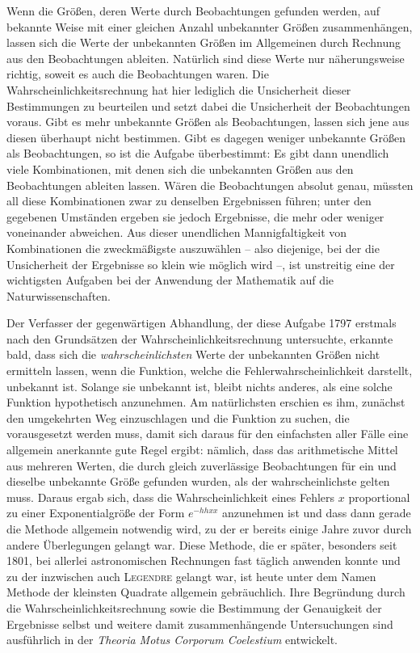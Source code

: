 Wenn die Größen, deren Werte durch Beobachtungen gefunden werden, auf bekannte Weise mit einer gleichen Anzahl unbekannter Größen zusammenhängen, lassen sich die Werte der unbekannten Größen im Allgemeinen durch Rechnung aus den Beobachtungen ableiten. Natürlich sind diese Werte nur näherungsweise richtig, soweit es auch die Beobachtungen waren. Die Wahrscheinlichkeitsrechnung hat hier lediglich die Unsicherheit dieser Bestimmungen zu beurteilen und setzt dabei die Unsicherheit der Beobachtungen voraus. Gibt es mehr unbekannte Größen als Beobachtungen, lassen sich jene aus diesen überhaupt nicht bestimmen. Gibt es dagegen weniger unbekannte Größen als Beobachtungen, so ist die Aufgabe überbestimmt: Es gibt dann unendlich viele Kombinationen, mit denen sich die unbekannten Größen aus den Beobachtungen ableiten lassen. Wären die Beobachtungen absolut genau, müssten all diese Kombinationen zwar zu denselben Ergebnissen führen; unter den gegebenen Umständen ergeben sie jedoch Ergebnisse, die mehr oder weniger voneinander abweichen. Aus dieser unendlichen Mannigfaltigkeit von Kombinationen die zweckmäßigste auszuwählen – also diejenige, bei der die Unsicherheit der Ergebnisse so klein wie möglich wird –, ist unstreitig eine der wichtigsten Aufgaben bei der Anwendung der Mathematik auf die Naturwissenschaften.

Der Verfasser der gegenwärtigen Abhandlung, der diese Aufgabe 1797 erstmals nach den Grundsätzen der Wahrscheinlichkeitsrechnung untersuchte, erkannte bald, dass sich die \textit{wahrscheinlichsten} Werte der unbekannten Größen nicht ermitteln lassen, wenn die Funktion, welche die Fehlerwahrscheinlichkeit darstellt, unbekannt ist. Solange sie unbekannt ist, bleibt nichts anderes, als eine solche Funktion hypothetisch anzunehmen. Am natürlichsten erschien es ihm, zunächst den umgekehrten Weg einzuschlagen und die Funktion zu suchen, die vorausgesetzt werden muss, damit sich daraus für den einfachsten aller Fälle eine allgemein anerkannte gute Regel ergibt: nämlich, dass das arithmetische Mittel aus mehreren Werten, die durch gleich zuverlässige Beobachtungen für ein und dieselbe unbekannte Größe gefunden wurden, als der wahrscheinlichste gelten muss. Daraus ergab sich, dass die Wahrscheinlichkeit eines Fehlers \(x\) proportional zu einer Exponentialgröße der Form \(e^{-hhxx}\) anzunehmen ist und dass dann gerade die Methode allgemein notwendig wird, zu der er bereits einige Jahre zuvor durch andere Überlegungen gelangt war. Diese Methode, die er später, besonders seit 1801, bei allerlei astronomischen Rechnungen fast täglich anwenden konnte und zu der inzwischen auch \textsc{Legendre} gelangt war,
ist heute unter dem Namen Methode der kleinsten Quadrate allgemein gebräuchlich. Ihre Begründung durch die Wahrscheinlichkeitsrechnung sowie die Bestimmung der Genauigkeit der Ergebnisse selbst und weitere damit zusammenhängende Untersuchungen sind ausführlich in der \textit{Theoria Motus Corporum Coelestium} entwickelt.

